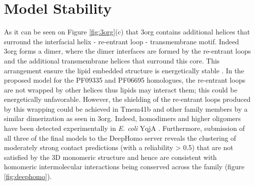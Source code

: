 \section{Model Stability}
As it can be seen on Figure \ref{fig:3org}(c) that 3org contains additional helices that surround the interfacial helix - re-entrant loop - transmembrane motif. Indeed 3org forms a dimer, where the dimer interfaces are formed by the re-entrant loops and the additional transmembrane helices that surround this core. This arrangement ensure the lipid embedded structure is energetically stable \cite{Feng2010}. In the proposed model for the PF09335 and PF06695 homologues, the re-entrant loops are not wrapped by other helices thus lipids may interact them; this could be energetically unfavorable.  However, the shielding of the re-entrant loops produced by this wrapping could be achieved in Tmem41b and other family members by a similar dimerization as seen in 3org. Indeed, homodimers and higher oligomers have been detected experimentally in \emph{E. coli} YqjA \cite{Keller2015, scarsbrook2021topological}. Furthermore, submission of all three of the final models to the DeepHomo server \cite{yan2021accurate} reveals the clustering of moderately strong contact predictions (with a reliability > 0.5) that are not satisfied by the 3D monomeric structure and hence are consistent with homomeric intermolecular interactions being conserved across the family (figure \ref{fig:deephomo}). 

